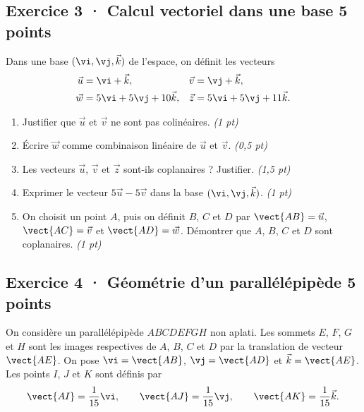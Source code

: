\clearpage{}\par

\subsection*{Exercice 3 · Calcul vectoriel dans une base \hfill 5 points}Dans une base $(\vi,\vj,\vec k)$ de l'espace, on définit les vecteurs
\[\begin{aligned}\vec u&=\vi+\vec k,&\vec v&=\vj+\vec k,\\
\vec w&=5\vi+5\vj+10\vec k,&\vec z&=5\vi+5\vj+11\vec k.\end{aligned}\]

\begin{enumerate}

\item Justifier que $\vec u$ et $\vec v$ ne sont pas colinéaires. \hfill\textit{(1 pt)}

\item Écrire $\vec w$ comme combinaison linéaire de $\vec u$ et $\vec v$. \hfill\textit{(0,5 pt)}

\item Les vecteurs $\vec u$, $\vec v$ et $\vec z$ sont-ils coplanaires ? Justifier. \hfill\textit{(1,5 pt)}

\item Exprimer le vecteur $5\vec u-5\vec v$ dans la base $(\vi,\vj,\vec k)$. \hfill\textit{(1 pt)}

\item On choisit un point $A$, puis on définit $B$, $C$ et $D$ par $\vect{AB}=\vec u$, $\vect{AC}=\vec v$ et $\vect{AD}=\vec w$. Démontrer que $A$, $B$, $C$ et $D$ sont coplanaires. \hfill\textit{(1 pt)}

\end{enumerate}

\subsection*{Exercice 4 · Géométrie d'un parallélépipède \hfill 5 points}On considère un parallélépipède $ABCDEFGH$ non aplati. Les sommets $E$, $F$, $G$ et $H$ sont les images respectives de $A$, $B$, $C$ et $D$ par la translation de vecteur $\vect{AE}$.
On pose $\vi=\vect{AB}$, $\vj=\vect{AD}$ et $\vec k=\vect{AE}$.
Les points $I$, $J$ et $K$ sont définis par
\[\vect{AI}=\frac1{15}\vi,\qquad\vect{AJ}=\frac1{15}\vj,\qquad\vect{AK}=\frac1{15}\vec k.\]


